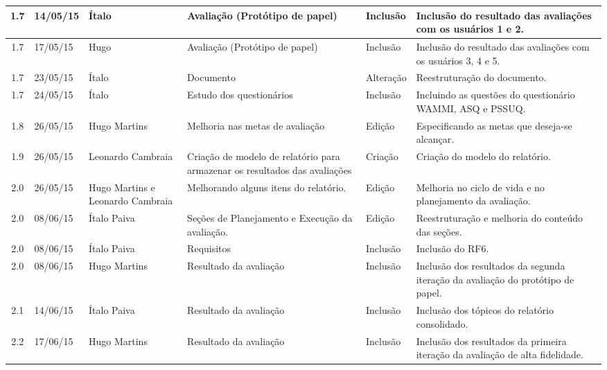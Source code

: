 \begin{longtable}{|c|m{2cm}|m{2.8cm}|m{2.3cm}|m{2.44cm}|m{4.2cm}|}
  \hline                               
  1.7 & 14/05/15 & Ítalo & Avaliação (Protótipo de papel) & Inclusão & Inclusão do resultado das avaliações com os usuários 1 e 2.\\
  
  \hline                               
  1.7 & 17/05/15 & Hugo & Avaliação (Protótipo de papel) & Inclusão & Inclusão do resultado das avaliações com os usuários 3, 4 e 5.\\
  
  \hline                               
  1.7 & 23/05/15 & Ítalo & Documento & Alteração & Reestruturação do documento.\\
  
  \hline                               
  1.7 & 24/05/15 & Ítalo & Estudo dos questionários & Inclusão & Incluindo as questões do questionário WAMMI, ASQ e PSSUQ.\\
  
  \hline                               
  1.8 & 26/05/15 & Hugo Martins & Melhoria nas metas de avaliação & Edição & Especificando as metas que deseja-se alcançar.\\
  
  \hline                               
  1.9 & 26/05/15 & Leonardo Cambraia & Criação de modelo de relatório para armazenar os resultados das avaliações & Criação & Criação do modelo do relatório.\\
  
  \hline                               
  2.0 & 26/05/15 & Hugo Martins e Leonardo Cambraia & Melhorando alguns itens do relatório. & Edição & Melhoria no ciclo de vida e no planejamento da avaliação.\\
  
  \hline                               
  2.0 & 08/06/15 & Ítalo Paiva & Seções de Planejamento e Execução da avaliação. & Edição & Reestruturação e melhoria do conteúdo das seções.\\
  
  \hline                               
  2.0 & 08/06/15 & Ítalo Paiva & Requisitos & Inclusão & Inclusão do RF6.\\  
  
  \hline                               
  2.0 & 08/06/15 & Hugo Martins & Resultado da avaliação & Inclusão & Inclusão dos resultados da segunda iteração da avaliação do protótipo de papel.\\ 
  \hline                               
  
  2.1 & 14/06/15 & Ítalo Paiva & Resultado da avaliação & Inclusão & Inclusão dos tópicos do relatório consolidado.\\   
  \hline
  
  2.2 & 17/06/15 & Hugo Martins & Resultado da avaliação & Inclusão & Inclusão dos resultados da primeira iteração da avaliação de alta fidelidade.\\   
  \hline
\end{longtable}